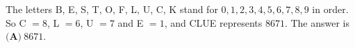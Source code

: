The letters B, E, S, T, O, F, L, U, C, K stand for $0,1,2,3,4,5,6,7,8,9$ in order. So C $=8$, L $=6$, U $=7$ and E $=1$, and CLUE represents $8671$. The answer is $\boxed{\textbf{(A)}\ 8671}$.
